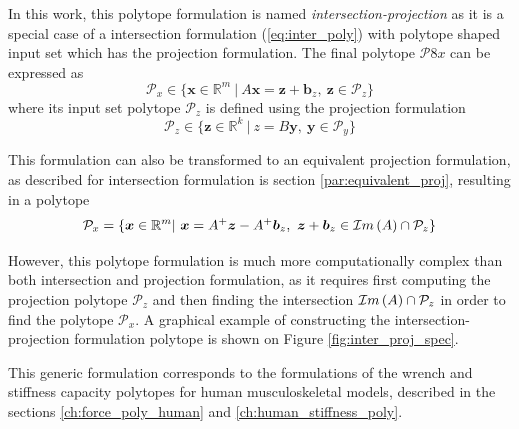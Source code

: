 In this work, this polytope formulation is named \textit{intersection-projection} as it is a special case of a intersection formulation (\ref{eq:inter_poly}) with polytope shaped input set which has the projection formulation. The final polytope $\mathcal{P}8x$ can be expressed as
\begin{equation}
    \mathcal{P}_x \in \{\bm{x}\in \mathbb{R}^m~|~A \bm{x} = \bm{z} + \bm{b}_z,~ \bm{z} \in \mathcal{P}_z\} 
\end{equation}
where its input set polytope $\mathcal{P}_z$ is defined using the projection formulation
\begin{equation}
    \mathcal{P}_z \in \{\bm{z}\in \mathbb{R}^k~|~z = B\bm{y},~ \bm{y} \in \mathcal{P}_y\} 
\end{equation}

This formulation can also be transformed to an equivalent projection formulation, as described for intersection formulation is section \ref{par:equivalent_proj}, resulting in a polytope 
\begin{equation}
\mathcal{P}_x=\{\bm{x} \in \mathbb{R}^m |~ \bm{x} = A^+\bm{z} - A^+\bm{b}_z,~ \bm{z}+\bm{b}_z \in \mathcal{I}m\left(A\right)\cap\mathcal{P}_z\} 
\end{equation}

However, this polytope formulation is much more computationally complex than both intersection and projection formulation, as it requires first computing the projection polytope $\mathcal{P}_z$ and then finding the intersection $\mathcal{I}m\left(A\right)\cap\mathcal{P}_z$ in order to find the polytope $\mathcal{P}_x$. A graphical example of constructing the intersection-projection formulation polytope is shown on Figure \ref{fig:inter_proj_spec}.


\begin{remark}
    This generic formulation corresponds to the formulations of the wrench and stiffness capacity polytopes for human musculoskeletal models, described in the sections \ref{ch:force_poly_human} and \ref{ch:human_stiffness_poly}.
\end{remark}


